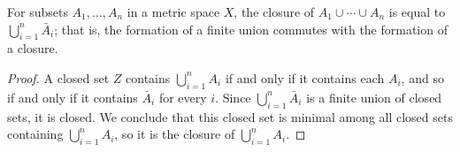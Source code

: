 \begin{corollary}
  For subsets \(A_1,\dotsc,A_n\) in a metric space \(X\), the closure of
  \(A_1\cup\dotsb\cup A_n\) is equal to \(\bigcup_{i=1}^n \bar A_i\); that
  is, the formation of a finite union commutes with the formation of a
  closure.
\end{corollary}
\begin{proof}
  A closed set \(Z\) contains \(\bigcup_{i=1}^n A_i\) if and only if it
  contains each \(A_i\), and so if and only if it contains \(\bar A_i\) for
  every \(i\). Since \(\bigcup_{i=1}^n\bar A_i\) is a finite union of
  closed sets, it is closed. We conclude that this closed set is minimal
  among all closed sets containing \(\bigcup_{i=1}^n A_i\), so it is the
  closure of \(\bigcup_{i=1}^n A_i\).
\end{proof}

